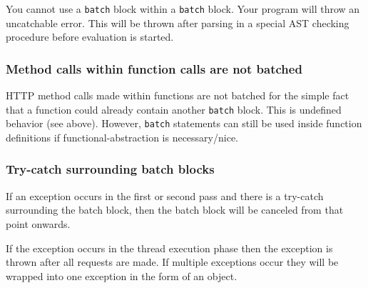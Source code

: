 \documentclass[12pt, letterpaper]{article}
\begin{document}
You cannot use a \verb|batch| block within a \verb|batch| block. Your program will throw an uncatchable error. This will be thrown after parsing in a special AST checking procedure before evaluation is started.

\subsubsection{Method calls within function calls are not batched}

HTTP method calls made within functions are not batched for the simple fact that a function could already contain another \verb|batch| block. This is undefined behavior (see above). However, \verb|batch| statements can still be used inside function definitions if functional-abstraction is necessary/nice.

\subsubsection{Try-catch surrounding batch blocks}

If an exception occurs in the first or second pass and there is a try-catch surrounding the batch block, then the batch block will be canceled from that point onwards.

If the exception occurs in the thread execution phase then the exception is thrown after all requests are made. If multiple exceptions occur they will be wrapped into one exception in the form of an object.
\end{document}
